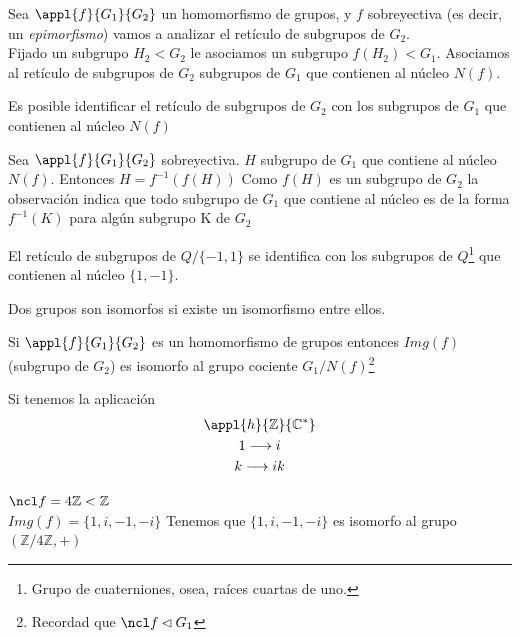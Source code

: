 \documentclass[a4paper,10pt]{apuntes}
\begin{document}
Sea $\appl{f}{G_1}{G_2}$ un homomorfismo de grupos, y $f$ sobreyectiva (es decir, un \textit{epimorfismo})
vamos a analizar el retículo de subgrupos de $G_2$.\\
Fijado un subgrupo $H_2<G_2$ le asociamos un subgrupo $f(H_2)<G_1$. Asociamos al retículo de subgrupos de $G_2$ subgrupos de $G_1$ que contienen al núcleo $N(f)$.
\begin{theorem}
Es posible identificar el retículo de subgrupos de $G_2$ con los subgrupos de $G_1$ que contienen al núcleo $N(f)$
\end{theorem}

\obs Sea $\appl{f}{G_1}{G_2}$ sobreyectiva. $H$ subgrupo de $G_1$ que contiene al núcleo $N(f)$. Entonces $H = f^{-1}(f(H))$
Como $f(H)$ es un subgrupo de $G_2$ la observación indica que todo subgrupo de $G_1$ que contiene al núcleo es de la forma $f^{-1}(K)$ para algún subgrupo K de $G_2$

\begin{example}
El retículo de subgrupos de $Q/{\{ -1, 1 \} }$ se identifica con los subgrupos de $Q$\footnote{Grupo de cuaterniones, osea, raíces cuartas de uno.} que contienen al núcleo $\{ 1, -1\} $.
\end{example}

\begin{defn}
Dos grupos son isomorfos si existe un isomorfismo entre ellos.
\end{defn}

\begin{theorem}
Si $\appl{f}{G_1}{G_2}$ es un homomorfismo de grupos entonces $Img(f)$ (subgrupo de $G_2$) es isomorfo al grupo cociente $G_1/{N(f)}$\footnote{Recordad que $\ncl f \lhd G_1$}
\end{theorem}

\begin{example}
Si tenemos la aplicación 
\begin{gather*}
\appl{h}{\mathbb{Z}}{\mathbb{C}^*}\\
1 \longrightarrow i\\
k\longrightarrow ik\\
\end{gather*}

$\ncl f = 4\mathbb{Z} < \mathbb{Z}$\\
$Img(f) = \{1, i, -1, -i \}$
Tenemos que $\{ 1, i, -1, -i \}$ es isomorfo al grupo $(\mathbb{Z} /4\mathbb{Z}, +)$
\end{example}

\newpage
\printindex
\end{document}
